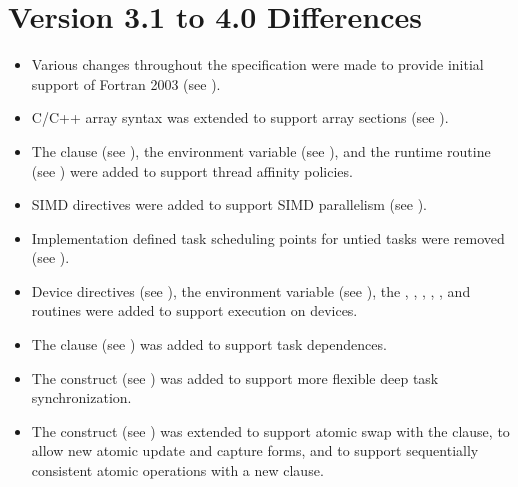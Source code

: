 \section{Version 3.1 to 4.0 Differences}
\label{sec:Version 3.1 to 4.0 Differences}
\begin{itemize}
\item Various changes throughout the specification were made to provide initial support of
Fortran 2003 (see
).

\item C/C++ array syntax was extended to support array sections (see
).

\item The  clause (see
),
the 
environment variable (see
), and the 
runtime routine (see
)
were added to support thread
affinity policies.

\item SIMD directives were added to support SIMD parallelism (see
).

\item Implementation defined task scheduling points for untied tasks were removed (see
).

\item Device directives (see
),
the 
environment variable (see
), the
, ,
, , , and
 routines were added to support execution on devices.

\item The  clause (see
)
was added to support task dependences.

\item The  construct (see
) was added to support
more flexible deep task synchronization.

\item The  construct (see
) was extended to support
atomic swap with the  clause, to allow new atomic update and capture
forms, and to support sequentially consistent atomic operations with a new 
clause.


\end{itemize}
